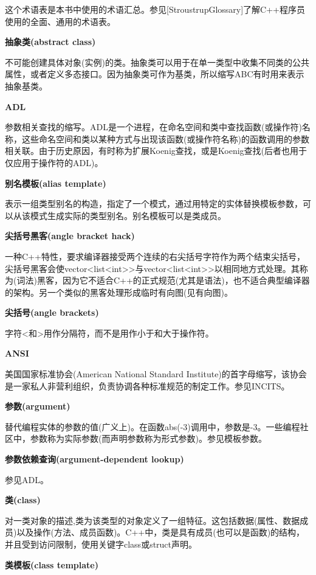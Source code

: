 
这个术语表是本书中使用的术语汇总。参见[StroustrupGlossary]了解C++程序员使用的全面、通用的术语表。

\noindent
\textbf{抽象类(abstract class)}

不可能创建具体对象(实例)的类。抽象类可以用于在单一类型中收集不同类的公共属性，或者定义多态接口。因为抽象类可作为基类，所以缩写ABC有时用来表示抽象基类。

\noindent
\textbf{ADL}

参数相关查找的缩写。ADL是一个进程，在命名空间和类中查找函数(或操作符)名称，这些命名空间和类以某种方式与出现该函数(或操作符名称)的函数调用的参数相关联。由于历史原因，有时称为扩展Koenig查找，或是Koenig查找(后者也用于仅应用于操作符的ADL)。

\noindent
\textbf{别名模板(alias template)}  

表示一组类型别名的构造，指定了一个模式，通过用特定的实体替换模板参数，可以从该模式生成实际的类型别名。别名模板可以是类成员。

\noindent
\textbf{尖括号黑客(angle bracket hack)}

一种C++特性，要求编译器接受两个连续的右尖括号字符作为两个结束尖括号，尖括号黑客会使vector<list<int>{}>与vector<list<int>{}>以相同地方式处理。其称为(词法)黑客，因为它不适合C++的正式规范(尤其是语法)，也不适合典型编译器的架构。另一个类似的黑客处理形成临时有向图(见有向图)。

\noindent
\textbf{尖括号(angle brackets)}

字符<和>用作分隔符，而不是用作小于和大于操作符。

\noindent
\textbf{ANSI}

美国国家标准协会(American National Standard Institute)的首字母缩写，该协会是一家私人非营利组织，负责协调各种标准规范的制定工作。参见INCITS。

\noindent
\textbf{参数(argument)}

替代编程实体的参数的值(广义上)。在函数abs(-3)调用中，参数是-3。一些编程社区中，参数称为实际参数(而声明参数称为形式参数)。参见模板参数。

\noindent
\textbf{参数依赖查询(argument-dependent lookup)}

参见ADL。

\noindent
\textbf{类(class)}
 
对一类对象的描述,类为该类型的对象定义了一组特征。这包括数据(属性、数据成员)以及操作(方法、成员函数)。C++中，类是具有成员(也可以是函数)的结构，并且受到访问限制，使用关键字class或struct声明。

\noindent
\textbf{类模板(class template)}


